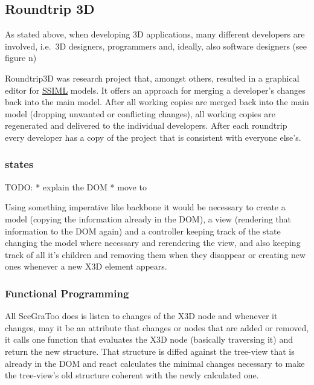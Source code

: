 \subsection{Roundtrip 3D}\label{roundtrip-3d}

As stated above, when developing 3D applications, many different
developers are involved, i.e.~3D designers, programmers and, ideally,
also software designers (see figure n)


Roundtrip3D was research project that, amongst others, resulted in a
graphical editor for \hyperref[ssiml]{SSIML} models. It offers an
approach for merging a developer's changes back into the main model.
After all working copies are merged back into the main model (dropping
unwanted or conflicting changes), all working copies are regenerated and
delivered to the individual developers. After each roundtrip every
developer has a copy of the project that is consistent with everyone
else's.

\subsubsection{states}\label{states}

TODO: * explain the DOM * move to

Using something imperative like backbone it would be necessary to create
a model (copying the information already in the DOM), a view (rendering
that information to the DOM again) and a controller keeping track of the
state changing the model where necessary and rerendering the view, and
also keeping track of all it's children and removing them when they
disappear or creating new ones whenever a new X3D element appears.

\subsubsection{Functional Programming}\label{functional-programming}

All SceGraToo does is listen to changes of the X3D node and whenever it
changes, may it be an attribute that changes or nodes that are added or
removed, it calls one function that evaluates the X3D node (basically
traversing it) and return the new structure. That structure is diffed
against the tree-view that is already in the DOM and react calculates
the minimal changes necessary to make the tree-view's old structure
coherent with the newly calculated one.

